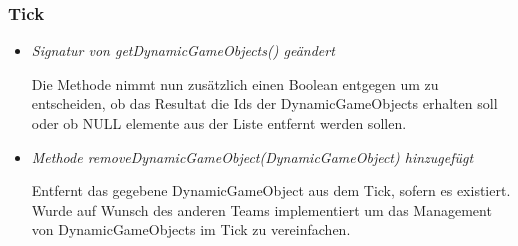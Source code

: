 \subsubsection{Tick}
\begin{itemize}
    \item \textit{Signatur von getDynamicGameObjects() geändert}
        \begin{leftbar}[0.9\linewidth]
            Die Methode nimmt nun zusätzlich einen Boolean entgegen um zu entscheiden, ob das Resultat die
            Ids der DynamicGameObjects erhalten soll oder ob NULL elemente aus der Liste entfernt werden
            sollen.
        \end{leftbar}

    \item \textit{Methode removeDynamicGameObject(DynamicGameObject) hinzugefügt}
        \begin{leftbar}[0.9\linewidth]
            Entfernt das gegebene DynamicGameObject aus dem Tick, sofern es existiert.
            Wurde auf Wunsch des anderen Teams implementiert um das Management von DynamicGameObjects
            im Tick zu vereinfachen.
        \end{leftbar}
\end{itemize}